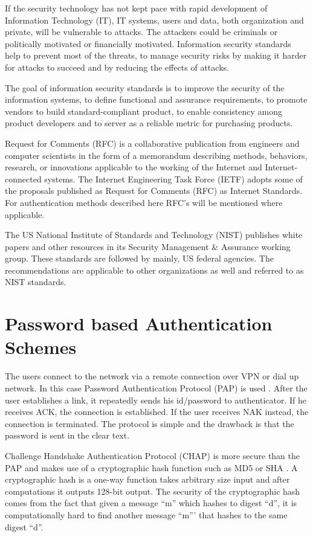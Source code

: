 \begin{multicols}{2}
If the security technology has not kept pace with rapid development of Information Technology (IT), IT systems, users and data, both organization and private, will be vulnerable to attacks. The attackers could be criminals or politically motivated or financially motivated. Information security standards help to prevent most of the threats, to manage security risks by making it harder for attacks to succeed and by reducing the effects of attacks.

The goal of information security standards is to improve the security of the information systems, to define functional and assurance requirements, to promote vendors to build standard-compliant product, to enable consistency among product developers and to server as a reliable metric for purchasing products.

Request for Comments (RFC) is a collaborative publication from engineers and computer scientists in the form of a memorandum describing methods, behaviors, research, or innovations applicable to the working of the Internet and Internet-connected systems. The Internet Engineering Task Force (IETF) adopts some of the proposals published as Request for Comments (RFC) as Internet Standards. For authentication methods described here RFC's will be mentioned where applicable.

The US National Institute of Standards and Technology (NIST) publishes white papers and other resources in its Security Management \& Assurance working group. These standards are followed by mainly, US federal agencies. The recommendations are applicable to other organizations as well and referred to as NIST standards.

\section*{Password based Authentication Schemes}

The users connect to the network via a remote connection over VPN or dial up network. In this case Password Authentication Protocol (PAP) is used \cite{key4}. After the user establishes a link, it repeatedly sends his id/password to authenticator. If he receives ACK, the connection is established. If the user receives NAK instead, the connection is terminated. The protocol is simple and the drawback is that the password is sent in the clear text.

Challenge Handshake Authentication Protocol (CHAP) is more secure than the PAP and makes use of a cryptographic hash function such as MD5 or SHA \cite{key1}. A cryptographic hash is a one-way function takes arbitrary size input and after computations it outputs 128-bit output. The security of the cryptographic hash comes from the fact that given a message ``m'' which hashes to digest ``d'', it is computationally hard to find another message ``m''' that hashes to the same digest ``d''.


\end{multicols}
